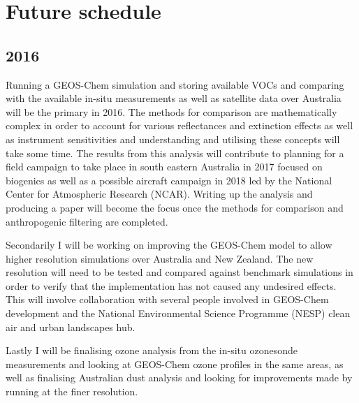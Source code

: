 \section{Future schedule}

\subsection{2016}

Running a GEOS-Chem simulation and storing available VOCs and comparing with the available in-situ measurements as well as satellite data over Australia will be the primary in 2016.
The methods for comparison are mathematically complex in order to account for various reflectances and extinction effects as well as instrument sensitivities and understanding and utilising these concepts will take some time.
The results from this analysis will contribute to planning for a field campaign to take place in south eastern Australia in 2017 focused on biogenics as well as a possible aircraft campaign in 2018 led by the National Center for Atmospheric Research (NCAR).
Writing up the analysis and producing a paper will become the focus once the methods for comparison and anthropogenic filtering are completed.

Secondarily I will be working on improving the GEOS-Chem model to allow higher resolution simulations over Australia and New Zealand.
The new resolution will need to be tested and compared against benchmark simulations in order to verify that the implementation has not caused any undesired effects.
This will involve collaboration with several people involved in GEOS-Chem development and the National Environmental Science Programme (NESP) clean air and urban landscapes hub.

Lastly I will be finalising ozone analysis from the in-situ ozonesonde measurements and looking at GEOS-Chem ozone profiles in the same areas, as well as finalising Australian dust analysis and looking for improvements made by running at the finer resolution.

